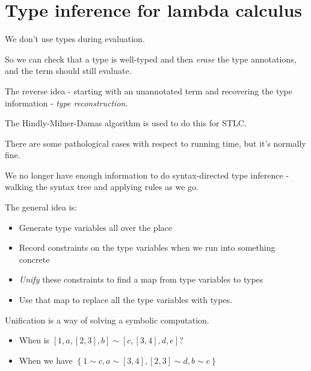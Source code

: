 
\section{Type inference for lambda calculus}

\begin{frame}
  We don't use types during evaluation.
\end{frame}

\begin{frame}
  So we can check that a type is well-typed and then {\it erase} the type
  annotations, and the term should still evaluate.
\end{frame}

\begin{frame}
  The reverse idea - starting with an unannotated term and recovering the type
  information - {\it type reconstruction}.
\end{frame}

\begin{frame}
  The Hindly-Milner-Damas algorithm is used to do this for STLC.
\end{frame}

\begin{frame}
  There are some pathological cases with respect to running time, but it's
  normally fine.
\end{frame}

\begin{frame}
  We no longer have enough information to do syntax-directed type inference -
  walking the syntax tree and applying rules as we go.
\end{frame}

\begin{frame}
  The general idea is:
  \begin{itemize}
  \pause
  \item <+-> Generate type variables all over the place
  \item <+-> Record constraints on the type variables when we run into something concrete
  \item <+-> {\it Unify} these constraints to find a map from type variables to types
  \item <+-> Use that map to replace all the type variables with types.
  \end{itemize}
\end{frame}

\begin{frame}
  Unification is a way of solving a symbolic computation.
  \begin{itemize}
    \pause
  \item<+-> When is $\left[1, a, \left[2,3\right], b\right] \sim \left[c, \left[3, 4\right], d, e\right]$?
  \item<+-> When we have $\left\{ 1 \sim c , a \sim \left[ 3, 4 \right], \left[
        2, 3 \right] \sim d, b \sim e \right\}$
  \end{itemize}
\end{frame}

